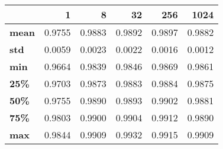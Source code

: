 \begin{tabular}{lrrrrr}
\toprule
{} &       1 &       8 &      32 &     256 &    1024 \\
\midrule
\textbf{mean} &  0.9755 &  0.9883 &  0.9892 &  0.9897 &  0.9882 \\
\textbf{std } &  0.0059 &  0.0023 &  0.0022 &  0.0016 &  0.0012 \\
\textbf{min } &  0.9664 &  0.9839 &  0.9846 &  0.9869 &  0.9861 \\
\textbf{25\% } &  0.9703 &  0.9873 &  0.9883 &  0.9884 &  0.9875 \\
\textbf{50\% } &  0.9755 &  0.9890 &  0.9893 &  0.9902 &  0.9881 \\
\textbf{75\% } &  0.9803 &  0.9900 &  0.9904 &  0.9912 &  0.9890 \\
\textbf{max } &  0.9844 &  0.9909 &  0.9932 &  0.9915 &  0.9909 \\
\bottomrule
\end{tabular}
